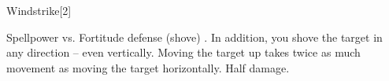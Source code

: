 \begin{spellsection}{Windstrike}[2]
    \begin{spellheader}
    \end{spellheader}
    \begin{spellcontent}
        \begin{spelltargetinginfo}
        \end{spelltargetinginfo}
        \begin{spelleffects}
            \begin{spellattack}{Spellpower vs. Fortitude defense (shove)}
                \spellsuccess[Fortitude] . In addition, you shove the target in any direction -- even vertically. Moving the target up takes twice as much movement as moving the target horizontally.
                \spellfailure[Fortitude] Half damage.
            \end{spellattack}
        \end{spelleffects}
    \end{spellcontent}
    \begin{spellfooter}
        \miscastrandom
    \end{spellfooter}
    \begin{spellaugments}
    \end{spellaugments}
\end{spellsection}


